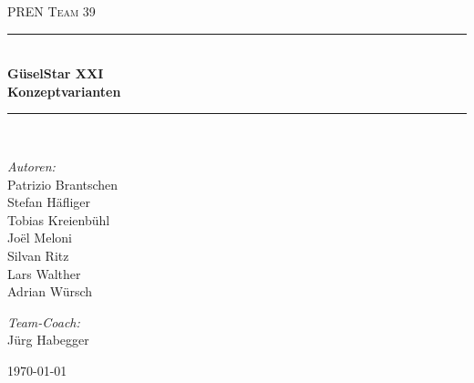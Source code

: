 \begin{titlepage}   

\begin{center}
\textsc{\Large PREN Team 39}\\[0.5cm]

\newcommand{\HRule}{\rule{\linewidth}{0.5mm}}
\HRule \\[0.4cm]
{ \huge \bfseries GüselStar XXI}\\[0.4cm]
{ \huge \bfseries Konzeptvarianten}\\[0.4cm]
\HRule \\[1.5cm]

\begin{minipage}{0.4\textwidth}
\begin{flushleft} \large
\emph{Autoren:}\\
Patrizio Brantschen\\
Stefan Häfliger\\
Tobias Kreienbühl\\
Joël Meloni\\
Silvan Ritz\\
Lars Walther\\
Adrian Würsch
\end{flushleft}
\end{minipage}
\hfill
\begin{minipage}{0.4\textwidth}
\begin{flushright} \large
\emph{Team-Coach:} \\
Jürg Habegger
\end{flushright}
\end{minipage}

\vfill

{\large \today}

\end{center}
\end{titlepage}